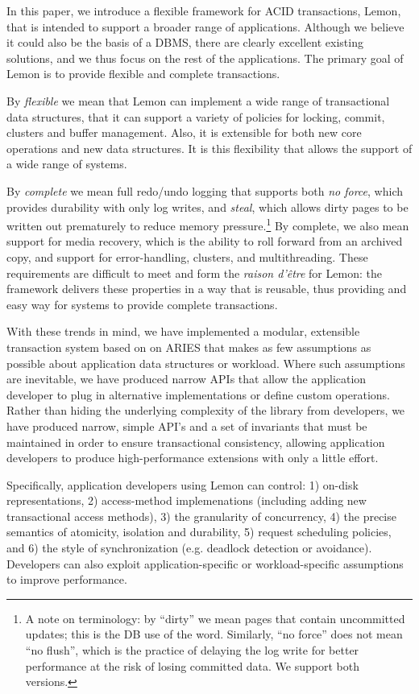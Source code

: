 \documentclass[letterpaper,twocolumn,english]{article}
\newcommand{\yad}{Lemon\xspace}
\begin{document}
In this paper, we introduce a flexible framework for ACID
transactions, \yad, that is intended to support a broader range of
applications.  Although we believe it could also be the basis of a
DBMS, there are clearly excellent existing solutions, and we thus
focus on the rest of the applications.  The primary goal of \yad is to
provide flexible and complete transactions.

By {\em flexible} we mean that \yad can implement a wide range of
transactional data structures, that it can support a variety of
policies for locking, commit, clusters and buffer management. Also,
it is extensible for both new core operations and new data
structures.  It is this flexibility that allows the support of a wide
range of systems.

By {\em complete} we mean full redo/undo logging that supports both
{\em no force}, which provides durability with only log writes, and
{\em steal}, which allows dirty pages to be written out prematurely to
reduce memory pressure.\footnote{A note on terminology: by ``dirty''
we mean pages that contain uncommitted updates; this is the DB use of
the word. Similarly, ``no force'' does not mean ``no flush'', which is
the practice of delaying the log write for better performance at the
risk of losing committed data. We support both versions.} By complete,
we also mean support for media recovery, which is the ability to roll
forward from an archived copy, and support for error-handling,
clusters, and multithreading.  These requirements are difficult to
meet and form the {\em raison d'\^{e}tre} for \yad: the framework delivers
these properties in a way that is reusable, thus providing and easy
way for systems to provide complete transactions.

With these trends in mind, we have implemented a modular, extensible
transaction system based on on ARIES that makes as few assumptions as
possible about application data structures or workload. Where such
assumptions are inevitable, we have produced narrow APIs that allow
the application developer to plug in alternative implementations or
define custom operations. Rather than hiding the underlying complexity
of the library from developers, we have produced narrow, simple API's
and a set of invariants that must be maintained in order to ensure
transactional consistency, allowing application developers to produce
high-performance extensions with only a little effort.  

Specifically, application developers using \yad can control: 1)
on-disk representations, 2) access-method implemenations (including
adding new transactional access methods), 3) the granularity of
concurrency, 4) the precise semantics of atomicity, isolation and
durability, 5) request scheduling policies, and 6) the style of
synchronization (e.g. deadlock detection or avoidance).  Developers
can also exploit application-specific or workload-specific assumptions
to improve performance.
\end{document}
